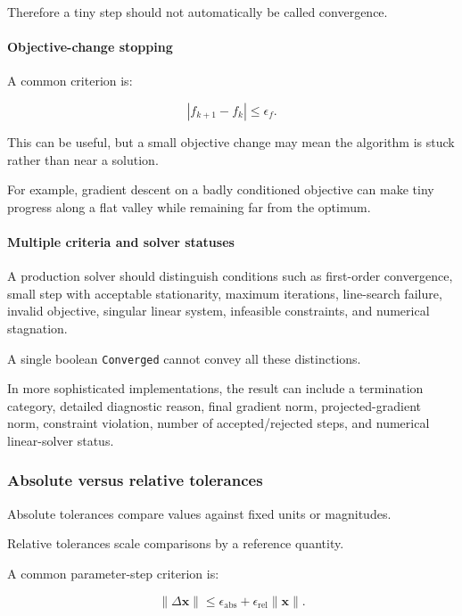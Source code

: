 Therefore a tiny step should not automatically be called convergence.

\paragraph{Objective-change stopping}\label{02-foundations-ii-ch027-objective-change-stopping}

A common criterion is:

\[
|f_{k+1}-f_k|\le\epsilon_f.
\]

This can be useful, but a small objective change may mean the algorithm is stuck rather than near a solution.

For example, gradient descent on a badly conditioned objective can make tiny progress along a flat valley while remaining far from the optimum.

\paragraph{Multiple criteria and solver statuses}\label{02-foundations-ii-ch027-multiple-criteria-and-solver-statuses}

A production solver should distinguish conditions such as first-order convergence, small step with acceptable stationarity, maximum iterations, line-search failure, invalid objective, singular linear system, infeasible constraints, and numerical stagnation.

A single boolean \texttt{Converged} cannot convey all these distinctions.

In more sophisticated implementations, the result can include a termination category, detailed diagnostic reason, final gradient norm, projected-gradient norm, constraint violation, number of accepted/rejected steps, and numerical linear-solver status.

\subsubsection{Absolute versus relative tolerances}\label{02-foundations-ii-ch027-absolute-versus-relative-tolerances}

Absolute tolerances compare values against fixed units or magnitudes.

Relative tolerances scale comparisons by a reference quantity.

A common parameter-step criterion is:

\[
\boxed{ \|\Delta\mathbf x\| \le \epsilon_{\mathrm{abs}}+ \epsilon_{\mathrm{rel}}\|\mathbf x\| }.
\]

